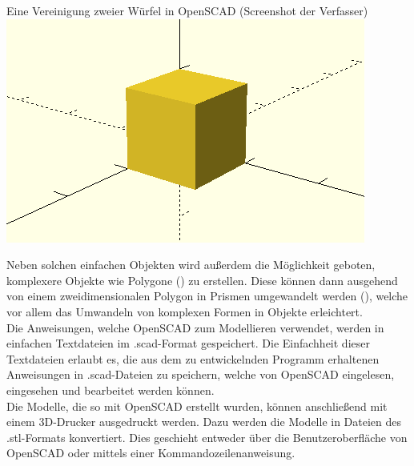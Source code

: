 \begin{Bild}{Eine Vereinigung zweier Würfel in OpenSCAD (Screenshot der Verfasser)}
	\includegraphics{Bilder/OpenSCAD_Union}
\end{Bild}

Neben solchen einfachen Objekten wird außerdem die Möglichkeit geboten, komplexere Objekte wie Polygone () zu erstellen.
Diese können dann ausgehend von einem zweidimensionalen Polygon in Prismen umgewandelt werden (), welche vor allem das Umwandeln von komplexen Formen in Objekte erleichtert. \\

Die Anweisungen, welche OpenSCAD zum Modellieren verwendet, werden in einfachen Textdateien im .scad-Format gespeichert.
Die Einfachheit dieser Textdateien erlaubt es, die aus dem zu entwickelnden Programm erhaltenen Anweisungen in .scad-Dateien zu speichern, welche von OpenSCAD eingelesen, eingesehen und bearbeitet werden können. \\

Die Modelle, die so mit OpenSCAD erstellt wurden, können anschließend mit einem 3D-Drucker ausgedruckt werden.
Dazu werden die Modelle in Dateien des .stl-Formats konvertiert.
Dies geschieht entweder über die Benutzeroberfläche von OpenSCAD oder mittels einer Kommandozeilenanweisung.

